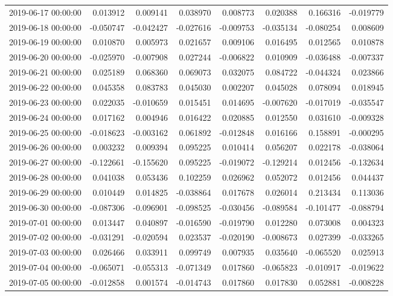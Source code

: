 \begin{tabular}{lrrrrrrr}
2019-06-17 00:00:00 & 0.013912 & 0.009141 & 0.038970 & 0.008773 & 0.020388 & 0.166316 & -0.019779 \\
2019-06-18 00:00:00 & -0.050747 & -0.042427 & -0.027616 & -0.009753 & -0.035134 & -0.080254 & 0.008609 \\
2019-06-19 00:00:00 & 0.010870 & 0.005973 & 0.021657 & 0.009106 & 0.016495 & 0.012565 & 0.010878 \\
2019-06-20 00:00:00 & -0.025970 & -0.007908 & 0.027244 & -0.006822 & 0.010909 & -0.036488 & -0.007337 \\
2019-06-21 00:00:00 & 0.025189 & 0.068360 & 0.069073 & 0.032075 & 0.084722 & -0.044324 & 0.023866 \\
2019-06-22 00:00:00 & 0.045358 & 0.083783 & 0.045030 & 0.002207 & 0.045028 & 0.078094 & 0.018945 \\
2019-06-23 00:00:00 & 0.022035 & -0.010659 & 0.015451 & 0.014695 & -0.007620 & -0.017019 & -0.035547 \\
2019-06-24 00:00:00 & 0.017162 & 0.004946 & 0.016422 & 0.020885 & 0.012550 & 0.031610 & -0.009328 \\
2019-06-25 00:00:00 & -0.018623 & -0.003162 & 0.061892 & -0.012848 & 0.016166 & 0.158891 & -0.000295 \\
2019-06-26 00:00:00 & 0.003232 & 0.009394 & 0.095225 & 0.010414 & 0.056207 & 0.022178 & -0.038064 \\
2019-06-27 00:00:00 & -0.122661 & -0.155620 & 0.095225 & -0.019072 & -0.129214 & 0.012456 & -0.132634 \\
2019-06-28 00:00:00 & 0.041038 & 0.053436 & 0.102259 & 0.026962 & 0.052072 & 0.012456 & 0.044437 \\
2019-06-29 00:00:00 & 0.010449 & 0.014825 & -0.038864 & 0.017678 & 0.026014 & 0.213434 & 0.113036 \\
2019-06-30 00:00:00 & -0.087306 & -0.096901 & -0.098525 & -0.030456 & -0.089584 & -0.101477 & -0.088794 \\
2019-07-01 00:00:00 & 0.013447 & 0.040897 & -0.016590 & -0.019790 & 0.012280 & 0.073008 & 0.004323 \\
2019-07-02 00:00:00 & -0.031291 & -0.020594 & 0.023537 & -0.020190 & -0.008673 & 0.027399 & -0.033265 \\
2019-07-03 00:00:00 & 0.026466 & 0.033911 & 0.099749 & 0.007935 & 0.035640 & -0.065520 & 0.025913 \\
2019-07-04 00:00:00 & -0.065071 & -0.055313 & -0.071349 & 0.017860 & -0.065823 & -0.010917 & -0.019622 \\
2019-07-05 00:00:00 & -0.012858 & 0.001574 & -0.014743 & 0.017860 & 0.017830 & 0.052881 & -0.008228 \\

\end{tabular}
